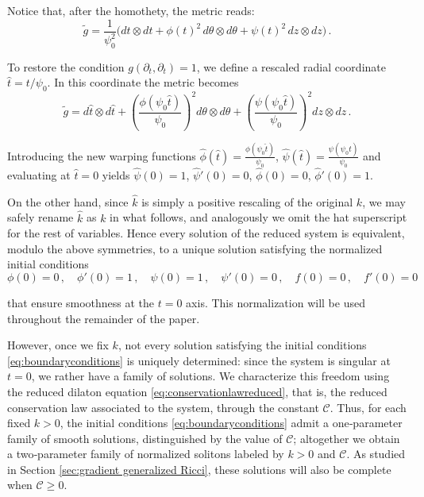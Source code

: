 \documentclass[12pt,a4paper,reqno]{amsart}
\theoremstyle{plain}
\theoremstyle{remark}
\numberwithin{equation}{section}
\newcommand{\cC}{\mathcal{C}}
\begin{document}
Notice that, after the homothety, the metric reads:
\begin{equation*}
\tilde{g} = \frac{1}{\psi_0^2}\big( dt \otimes dt + \phi(t)^2\,d\theta \otimes d\theta + \psi(t)^2\,dz \otimes dz \big) \,.
\end{equation*}

To restore the condition $g(\partial_t,\partial_t)=1$, we define a rescaled radial coordinate $\hat{t} = t/\psi_0$. In this coordinate the metric becomes
\begin{equation*}
\tilde{g} = d\hat{t} \otimes d\hat{t} + \left(\frac{\phi(\psi_0\hat{t})}{\psi_0}\right)^2 d\theta \otimes d\theta + \left(\frac{\psi(\psi_0\hat{t})}{\psi_0}\right)^2 dz \otimes dz \,.
\end{equation*}

Introducing the new warping functions
$\hat{\phi}(\hat{t}) = \frac{\phi(\psi_0\hat{t})}{\psi_0}$,
$\hat\psi(\hat{t}) = \frac{\psi(\psi_0\hat{t})}{\psi_0}$
and evaluating at $\hat{t} = 0$ yields
$\hat{\psi}(0)=1$, $\hat{\psi}'(0)=0$, $\hat{\phi}(0)=0$, $\hat{\phi}'(0)=1$.

On the other hand, since $\hat{k}$ is simply a positive rescaling of the original $k$, we may safely rename $\hat{k}$ as $k$ in what follows, and analogously we omit the hat superscript for the rest of variables. Hence every solution of the reduced system is equivalent, modulo the above symmetries, to a unique solution satisfying the normalized initial conditions
\begin{equation}\label{eq:boundaryconditions}
\phi(0)=0 \,, \quad \phi'(0)=1 \,, \quad \psi(0)=1 \,, \quad \psi'(0)=0 \,, \quad f(0)=0 \,, \quad f'(0)=0
\end{equation}

that ensure smoothness at the $t=0$ axis. This normalization will be used throughout the remainder of the paper.

However, once we fix $k$, not every solution satisfying the initial conditions \eqref{eq:boundaryconditions} is uniquely determined: since the system is singular at $t=0$, we rather have a family of solutions. We characterize this freedom using the reduced dilaton equation \eqref{eq:conservationlawreduced}, that is, the reduced conservation law associated to the system, through the constant $\cC$. Thus, for each fixed $k>0$, the initial conditions \eqref{eq:boundaryconditions} admit a one‑parameter family of smooth solutions, distinguished by the value of $\cC$; altogether we obtain a two‑parameter family of normalized solitons labeled by $k>0$ and $\cC$. As studied in Section \ref{sec:gradient generalized Ricci}, these solutions will also be complete when $\cC\ge0$.
\end{document}
